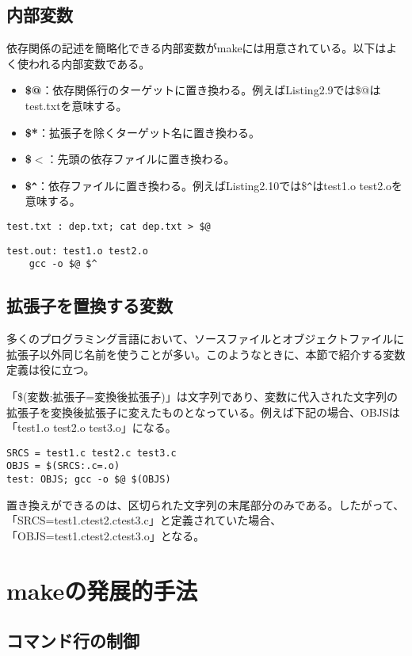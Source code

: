 \documentclass[dvipdfmx, 9pt, a4paper]{jsarticle}
\numberwithin{equation}{section}
\begin{document}
\subsection{内部変数}
依存関係の記述を簡略化できる内部変数がmakeには用意されている。以下はよく使われる内部変数である。
\begin{itemize}
\item {\bf \$@}：依存関係行のターゲットに置き換わる。例えばListing2.9では\$@はtest.txtを意味する。
\item {\bf \$*}：拡張子を除くターゲット名に置き換わる。
\item {\bf \$$<$}：先頭の依存ファイルに置き換わる。
\item {\bf \$\verb|^|}：依存ファイルに置き換わる。例えばListing2.10では\$\verb|^|はtest1.o test2.oを意味する。
\end{itemize}
\begin{lstlisting}[caption=内部変数1]
test.txt : dep.txt; cat dep.txt > $@
\end{lstlisting}
\begin{lstlisting}[caption=内部変数2]
test.out: test1.o test2.o
	gcc -o $@ $^
\end{lstlisting}

\subsection{拡張子を置換する変数}
多くのプログラミング言語において、ソースファイルとオブジェクトファイルに拡張子以外同じ名前を使うことが多い。このようなときに、本節で紹介する変数定義は役に立つ。\par
「\$(変数:拡張子=変換後拡張子)」は文字列であり、変数に代入された文字列の拡張子を変換後拡張子に変えたものとなっている。例えば下記の場合、OBJSは「test1.o test2.o test3.o」になる。
\begin{lstlisting}[caption=拡張子変換]
SRCS = test1.c test2.c test3.c
OBJS = $(SRCS:.c=.o)
test: OBJS; gcc -o $@ $(OBJS)
\end{lstlisting}
置き換えができるのは、区切られた文字列の末尾部分のみである。したがって、「SRCS=test1.ctest2.ctest3.c」と定義されていた場合、「OBJS=test1.ctest2.ctest3.o」となる。

\section{makeの発展的手法}
\subsection{コマンド行の制御}
\end{document}
